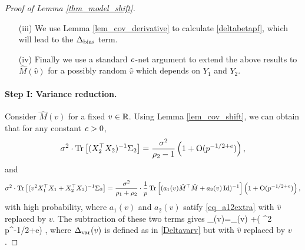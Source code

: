 \begin{proof}[Proof of Lemma \ref{thm_model_shift}]
\begin{itemize}
\item[(iii)] We use Lemma \ref{lem_cov_derivative} to calculate \eqref{deltabetapf}, which will lead to the $\Delta_{\text{bias}}$ term.

\item[(iv)] Finally we use a standard ${\mathit{c}}$-net argument to extend the above results to $\hat M(\hat v)$ for a possibly random $\hat v$ which depends on $Y_1$ and $Y_2$.
\end{itemize}


\paragraph{Step I: Variance reduction.} Consider $\hat M(v)$ for a fixed $v\in \mathbb{R}$. Using Lemma \ref{lem_cov_shift}, we can obtain that for any constant ${\mathit{c}}>0$,  
$$  \sigma^2 \cdot \operatorname{Tr}\left[(X_2^{\top}X_2)^{-1}\Sigma_2\right] = \frac{\sigma^2}{\rho_2-1}\left( 1+ \operatorname{O}(p^{-1/2+e})\right),$$
and 
$$ \sigma^2 \cdot \operatorname{Tr}\left[( {v}^2 X_1^{\top}X_1 + X_2^{\top}X_2)^{-1} \Sigma_2\right] =   \frac {\sigma^2} {\rho_1 + \rho_2}\cdot \frac1p \operatorname{Tr}\left[( a_1(v) \hat M^{\top}\hat M + a_2(v)\operatorname{Id})^{-1}\right]\left( 1+ \operatorname{O}(p^{-1/2+e})\right) ,$$
with high probability, where $a_1(v)$ and $a_2(v)$ satify \eqref{eq_a12extra} with $\hat v$ replaced by $v$. The subtraction of these two terms gives 
\be\label{deltavaral-} \delta_{\vari}(v)=\Delta_{\vari}(v) +\OO( \sigma^2 p^{-1/2+e}) \quad {},
\ee 
where $\Delta_{\text{var}}(v)$ is defined as in \eqref{Deltavarv} but with $\hat v$ replaced by $v$.




\end{proof}

